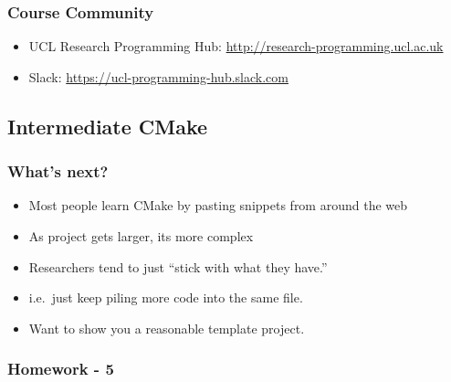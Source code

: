 \hypertarget{course-community}{%
\subsubsection{Course Community}\label{course-community}}

\begin{itemize}
\tightlist
\item
  UCL Research Programming Hub:
  \href{http://research-programming.ucl.ac.uk/}{http://research-programming.ucl.ac.uk}
\item
  Slack:
  \href{https://ucl-programming-hub.slack.com/}{https://ucl-programming-hub.slack.com}
\end{itemize}

\hypertarget{intermediate-cmake}{%
\subsection{Intermediate CMake}\label{intermediate-cmake}}

\hypertarget{whats-next}{%
\subsubsection{What's next?}\label{whats-next}}

\begin{itemize}
\tightlist
\item
  Most people learn CMake by pasting snippets from around the web
\item
  As project gets larger, its more complex
\item
  Researchers tend to just ``stick with what they have.''
\item
  i.e.~just keep piling more code into the same file.
\item
  Want to show you a reasonable template project.
\end{itemize}

\hypertarget{homework---5}{%
\subsubsection{Homework - 5}\label{homework---5}}

